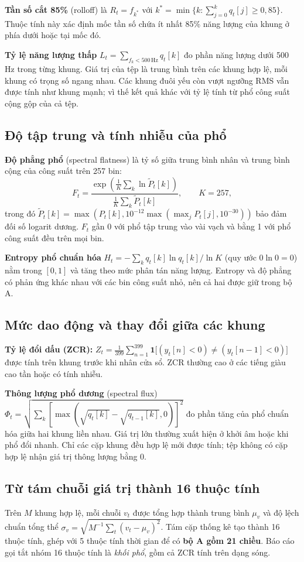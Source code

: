 \documentclass[11pt,a4paper]{article}
\begin{document}
\textbf{Tần số cắt 85\%} (rolloff) là $R_t=f_{k^*}$ với $k^*=\min\{k:\sum_{j=0}^kq_t[j]\geq0{,}85\}$. Thuộc tính này xác định mốc tần số chứa ít nhất 85\% năng lượng của khung ở phía dưới hoặc tại mốc đó.

\textbf{Tỷ lệ năng lượng thấp} $L_t=\sum_{f_k<500\,\mathrm{Hz}}q_t[k]$ đo phần năng lượng dưới 500 Hz trong từng khung. Giá trị của tệp là trung bình trên các khung hợp lệ, mỗi khung có trọng số ngang nhau. Các khung đuôi yếu còn vượt ngưỡng RMS vẫn được tính như khung mạnh; vì thế kết quả khác với tỷ lệ tính từ phổ công suất cộng gộp của cả tệp.

\subsection{Độ tập trung và tính nhiễu của phổ}
\textbf{Độ phẳng phổ} (spectral flatness) là tỷ số giữa trung bình nhân và trung bình cộng của công suất trên 257 bin:
\[
F_t=\frac{\exp\left(\frac{1}{K}\sum_k\ln\widetilde P_t[k]\right)}{\frac{1}{K}\sum_k\widetilde P_t[k]},\qquad K=257,
\]
trong đó $\widetilde P_t[k]=\max(P_t[k],10^{-12}\max(\max_jP_t[j],10^{-30}))$ bảo đảm đối số logarit dương. $F_t$ gần 0 với phổ tập trung vào vài vạch và bằng 1 với phổ công suất đều trên mọi bin.

\textbf{Entropy phổ chuẩn hóa} $H_t=-\sum_kq_t[k]\ln q_t[k]/\ln K$ (quy ước $0\ln0=0$) nằm trong $[0,1]$ và tăng theo mức phân tán năng lượng. Entropy và độ phẳng có phản ứng khác nhau với các bin công suất nhỏ, nên cả hai được giữ trong bộ A.

\subsection{Mức dao động và thay đổi giữa các khung}
\textbf{Tỷ lệ đổi dấu (ZCR):} $Z_t=\frac{1}{399}\sum_{n=1}^{399}\mathbf1\big[(y_t[n]<0)\ne(y_t[n-1]<0)\big]$ được tính trên khung trước khi nhân cửa sổ. ZCR thường cao ở các tiếng giàu cao tần hoặc có tính nhiễu.

\textbf{Thông lượng phổ dương} (spectral flux) $\Phi_t=\sqrt{\sum_k[\max(\sqrt{q_t[k]}-\sqrt{q_{t-1}[k]},0)]^2}$ đo phần tăng của phổ chuẩn hóa giữa hai khung liền nhau. Giá trị lớn thường xuất hiện ở khởi âm hoặc khi phổ đổi nhanh. Chỉ các cặp khung đều hợp lệ mới được tính; tệp không có cặp hợp lệ nhận giá trị thông lượng bằng 0.

\subsection{Từ tám chuỗi giá trị thành 16 thuộc tính}\label{sec:tonghop}
Trên $M$ khung hợp lệ, mỗi chuỗi $v_t$ được tổng hợp thành trung bình $\mu_v$ và độ lệch chuẩn tổng thể $\sigma_v=\sqrt{M^{-1}\sum_t(v_t-\mu_v)^2}$. Tám cặp thống kê tạo thành 16 thuộc tính, ghép với 5 thuộc tính thời gian để có \textbf{bộ A gồm 21 chiều}. Báo cáo gọi tắt nhóm 16 thuộc tính là \emph{khối phổ}, gồm cả ZCR tính trên dạng sóng.
\end{document}
